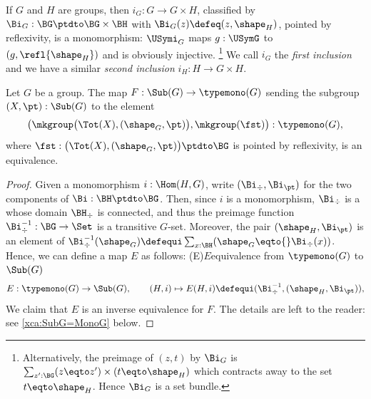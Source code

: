 \begin{example}
  \label{ex:prodinclismono}
  If $G$ and $H$ are groups, then $i_G : G \to G\times H$, classified by
  $\Bi_G : \BG \ptdto \BG\times\BH$ with $\Bi_G(z) \defeq (z,\sh_H)$, pointed by
  reflexivity, is a monomorphism: $\USymi_G$ maps $g:\USymG$ to
  $(g,\refl{\sh_H})$ and is obviously injective.%
  \footnote{Alternatively, the preimage of $(z,t)$ by $\Bi_G$ is
    $\sum_{z':\BG} (z \eqto z') \times (t \eqto \sh_H)$ which contracts away to
    the set $t \eqto \sh_H$. Hence $\Bi_G$ is a set bundle.} %
  We call $i_G$ the \emph{first inclusion} and we have a similar \emph{second
    inclusion} $i_H : H \to G\times H$.
\end{example}

\begin{lemma}\label{lem:SubG=MonoG}
  Let $G$ be a group.  The map $F: \Sub(G)\to \typemono(G)$ sending the subgroup
  $(X,\pt) : \Sub(G)$ to the element
  \begin{displaymath}
    \bigl(\mkgroup\bigl(\Tot(X),(\sh_G,\pt)\bigr),\mkgroup(\fst)\bigr) : \typemono(G),
  \end{displaymath}
  where $\fst: \bigl(\Tot(X),(\sh_G,\pt)\bigr)\ptdto\BG$ is pointed by
  reflexivity, is an equivalence.%
\end{lemma}

\begin{proof}
  Given a monomorphism $i:\Hom(H,G)$, write $(\Bi_\div,\Bi_\pt)$ for the two
  components of $\Bi :\BH\ptdto\BG$. Then, since $i$ is a monomorphism,
  $\Bi_\div$ is a \covering whose domain $\BH_\div$ is connected, and thus the
  preimage function $\Bi_\div^{-1} : \BG \to \Set$ is a transitive
  $G$-set. Moreover, the pair $(\sh_H,\Bi_\pt)$ is an element of
  $\Bi_\div^{-1}(\sh_G) \defequi \sum_{x:\BH}(\sh_G\eqto{}\Bi_\div(x))$. Hence,
  we can define a map $E$ as follows:%
  \glossary(E){$E$}{equivalence from $\protect\typemono(G)$ to
    $\protect\Sub(G)$}
  \[
    E:\typemono(G)\to\Sub(G),\qquad
    (H,i)\mapsto E(H,i)\defequi (\Bi_\div^{-1},(\sh_H,\Bi_\pt)),
  \]
  We claim that $E$ is an inverse equivalence for $F$. The details are left to
  the reader: see \cref{xca:SubG=MonoG} below.
\end{proof}

